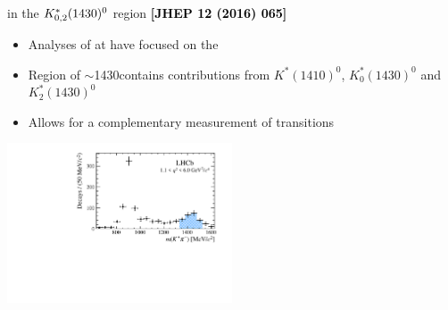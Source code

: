 \documentclass[aspectratio=1610]{beamer}
\def\Kstarfourteenthirty  {{\ensuremath{\kaon^{*}_{0,2}(1430)^{0}}}\xspace}
\begin{document}
\begin{frame}{\BdToKpimm in the \Kstarfourteenthirty region \hspace{0pt plus 1 filll} {\small \bf \textcolor{black}{[JHEP 12 (2016) 065]}}}
\begin{itemize}
\item Analyses of \BdToKpimm at \lhcb have focused on the \KstP
\item Region of \mkpi $\sim$1430\mevcc contains contributions from $K^\ast(1410)^0$, $K^\ast_0(1430)^0$ and $K^\ast_2(1430)^0$
\item Allows for a complementary measurement of \btosll transitions
\end{itemize}

\bigskip
\centering
\includegraphics[width=0.5\textwidth]{figs/kpimm/introduction/full-mkpi.pdf}
\end{frame}
\end{document}
